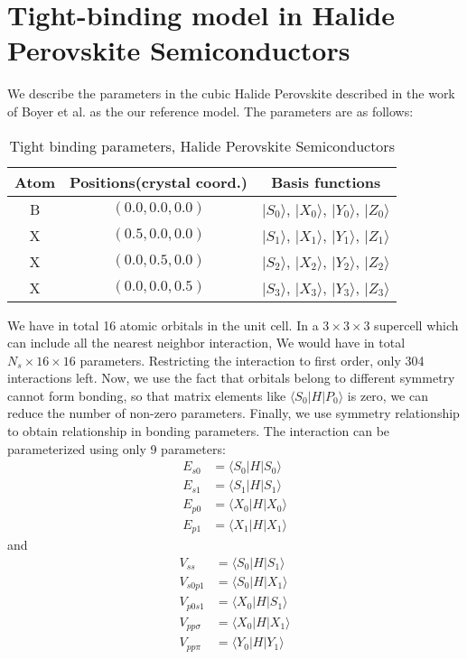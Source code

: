 \documentclass{article}
\begin{document}
\section{Tight-binding model in Halide Perovskite Semiconductors}
We describe the parameters in the cubic Halide Perovskite described in 
the work of Boyer et al.\cite{boyer-richard_symmetry-based_2016} as the 
our reference model. The parameters are as follows:
\begin{table}[h]
    \centering
    \caption{Tight binding parameters, Halide Perovskite Semiconductors}
    \label{T:TBP}
    \begin{tabular}{|c|c|c|}
        \hline
        Atom & Positions(crystal coord.) & Basis functions \\
        \hline
        B & $(0.0,0.0,0.0)$ & $|S_0\rangle$, $|X_0\rangle$, $|Y_0\rangle$, $|Z_0\rangle$ \\
        X & $(0.5,0.0,0.0)$ & $|S_1\rangle$, $|X_1\rangle$, $|Y_1\rangle$, $|Z_1\rangle$ \\
        X & $(0.0,0.5,0.0)$ & $|S_2\rangle$, $|X_2\rangle$, $|Y_2\rangle$, $|Z_2\rangle$ \\
        X & $(0.0,0.0,0.5)$ & $|S_3\rangle$, $|X_3\rangle$, $|Y_3\rangle$, $|Z_3\rangle$ \\
        \hline
    \end{tabular}
\end{table}
We have in total 16 atomic orbitals in the unit cell. In a $3\times 3\times 3$ supercell
which can include all the nearest neighbor interaction, We would have in total $N_s \times 16 \times 16$ parameters. 
Restricting the interaction to first order, only 304 interactions left. 
Now, we use the fact that orbitals belong to different symmetry cannot form bonding, 
so that matrix elements like $\langle S_0 | H | P_0 \rangle$ is zero, we can reduce the 
number of non-zero parameters. 
Finally, we use symmetry relationship to obtain relationship in bonding parameters. 
The interaction can be parameterized using only 9 parameters:
\begin{align*}
    E_{s0} &= \langle S_0 | H | S_0 \rangle \\
    E_{s1} &= \langle S_1 | H | S_1 \rangle \\
    E_{p0} &= \langle X_0 | H | X_0 \rangle \\
    E_{p1} &= \langle X_1 | H | X_1 \rangle 
\end{align*}
and 
\begin{align*}
    V_{ss} &= \langle S_0 | H | S_1 \rangle  \\
    V_{s0p1} &= \langle S_0 | H | X_1 \rangle \\
    V_{p0s1} &= \langle X_0 | H | S_1 \rangle \\
    V_{pp\sigma} &= \langle X_0 | H | X_1 \rangle \\
    V_{pp\pi} &= \langle Y_0 | H | Y_1 \rangle \\
\end{align*}
\end{document}
